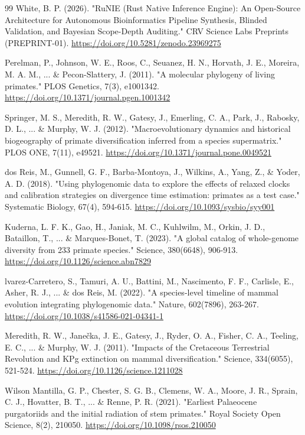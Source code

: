 \documentclass[10pt,letterpaper]{article}
\begin{document}
\begin{thebibliography}{99}
 White, B. P. (2026). "RuNIE (Rust Native Inference Engine): An Open-Source Architecture for Autonomous Bioinformatics Pipeline Synthesis, Blinded Validation, and Bayesian Scope-Depth Auditing." CRV Science Labs Preprints (PREPRINT-01). \url{https://doi.org/10.5281/zenodo.23969275}

 Perelman, P., Johnson, W. E., Roos, C., Seuanez, H. N., Horvath, J. E., Moreira, M. A. M., ... \& Pecon-Slattery, J. (2011). "A molecular phylogeny of living primates." PLOS Genetics, 7(3), e1001342. \url{https://doi.org/10.1371/journal.pgen.1001342}

 Springer, M. S., Meredith, R. W., Gatesy, J., Emerling, C. A., Park, J., Rabosky, D. L., ... \& Murphy, W. J. (2012). "Macroevolutionary dynamics and historical biogeography of primate diversification inferred from a species supermatrix." PLOS ONE, 7(11), e49521. \url{https://doi.org/10.1371/journal.pone.0049521}

 dos Reis, M., Gunnell, G. F., Barba-Montoya, J., Wilkins, A., Yang, Z., \& Yoder, A. D. (2018). "Using phylogenomic data to explore the effects of relaxed clocks and calibration strategies on divergence time estimation: primates as a test case." Systematic Biology, 67(4), 594-615. \url{https://doi.org/10.1093/sysbio/syy001}

 Kuderna, L. F. K., Gao, H., Janiak, M. C., Kuhlwilm, M., Orkin, J. D., Bataillon, T., ... \& Marques-Bonet, T. (2023). "A global catalog of whole-genome diversity from 233 primate species." Science, 380(6648), 906-913. \url{https://doi.org/10.1126/science.abn7829}

  lvarez-Carretero, S., Tamuri, A. U., Battini, M., Nascimento, F. F., Carlisle, E., Asher, R. J., ... \& dos Reis, M. (2022). "A species-level timeline of mammal evolution integrating phylogenomic data." Nature, 602(7896), 263-267. \url{https://doi.org/10.1038/s41586-021-04341-1}

 Meredith, R. W., Jane\v{c}ka, J. E., Gatesy, J., Ryder, O. A., Fisher, C. A., Teeling, E. C., ... \& Murphy, W. J. (2011). "Impacts of the Cretaceous Terrestrial Revolution and KPg extinction on mammal diversification." Science, 334(6055), 521-524. \url{https://doi.org/10.1126/science.1211028}

 Wilson Mantilla, G. P., Chester, S. G. B., Clemens, W. A., Moore, J. R., Sprain, C. J., Hovatter, B. T., ... \& Renne, P. R. (2021). "Earliest Palaeocene purgatoriids and the initial radiation of stem primates." Royal Society Open Science, 8(2), 210050. \url{https://doi.org/10.1098/rsos.210050}


\end{thebibliography}
\end{document}
